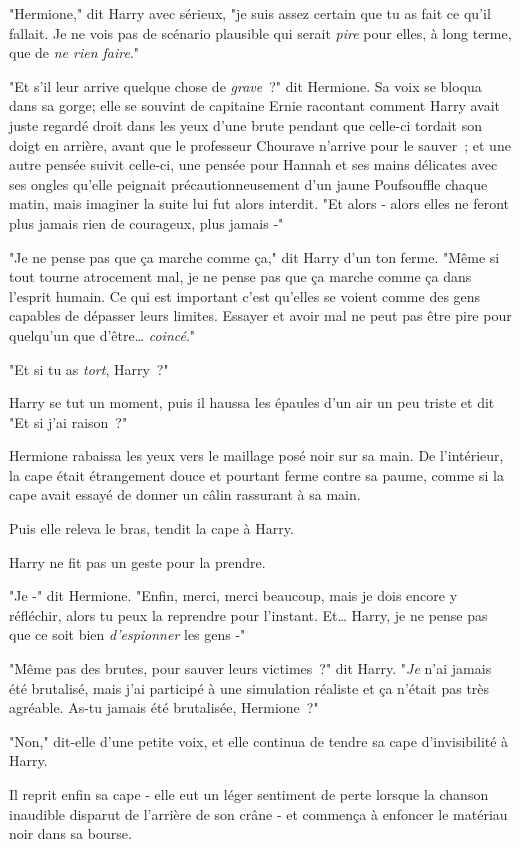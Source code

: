 "Hermione," dit Harry avec sérieux, "je suis assez certain que tu as fait ce qu'il fallait. Je ne vois pas de scénario plausible qui serait \emph{pire} pour elles, à long terme, que de \emph{ne rien faire}."

"Et s'il leur arrive quelque chose de \emph{grave}~?" dit Hermione. Sa voix se bloqua dans sa gorge; elle se souvint de capitaine Ernie racontant comment Harry avait juste regardé droit dans les yeux d'une brute pendant que celle-ci tordait son doigt en arrière, avant que le professeur Chourave n'arrive pour le sauver~; et une autre pensée suivit celle-ci, une pensée pour Hannah et ses mains délicates avec ses ongles qu'elle peignait précautionneusement d'un jaune Poufsouffle chaque matin, mais imaginer la suite lui fut alors interdit. "Et alors - alors elles ne feront plus jamais rien de courageux, plus jamais -"

"Je ne pense pas que ça marche comme ça," dit Harry d'un ton ferme. "Même si tout tourne atrocement mal, je ne pense pas que ça marche comme ça dans l'esprit humain. Ce qui est important c'est qu'elles se voient comme des gens capables de dépasser leurs limites. Essayer et avoir mal ne peut pas être pire pour quelqu'un que d'être… \emph{coincé}."

"Et si tu as \emph{tort}, Harry~?"

Harry se tut un moment, puis il haussa les épaules d'un air un peu triste et dit "Et si j'ai raison~?"

Hermione rabaissa les yeux vers le maillage posé noir sur sa main. De l'intérieur, la cape était étrangement douce et pourtant ferme contre sa paume, comme si la cape avait essayé de donner un câlin rassurant à sa main.

Puis elle releva le bras, tendit la cape à Harry.

Harry ne fit pas un geste pour la prendre.

"Je -" dit Hermione. "Enfin, merci, merci beaucoup, mais je dois encore y réfléchir, alors tu peux la reprendre pour l'instant. Et… Harry, je ne pense pas que ce soit bien \emph{d'espionner} les gens -"

"Même pas des brutes, pour sauver leurs victimes~?" dit Harry. "\emph{Je} n'ai jamais été brutalisé, mais j'ai participé à une simulation réaliste et ça n'était pas très agréable. As-tu jamais été brutalisée, Hermione~?"

"Non," dit-elle d'une petite voix, et elle continua de tendre sa cape d'invisibilité à Harry.

Il reprit enfin sa cape - elle eut un léger sentiment de perte lorsque la chanson inaudible disparut de l'arrière de son crâne - et commença à enfoncer le matériau noir dans sa bourse.

